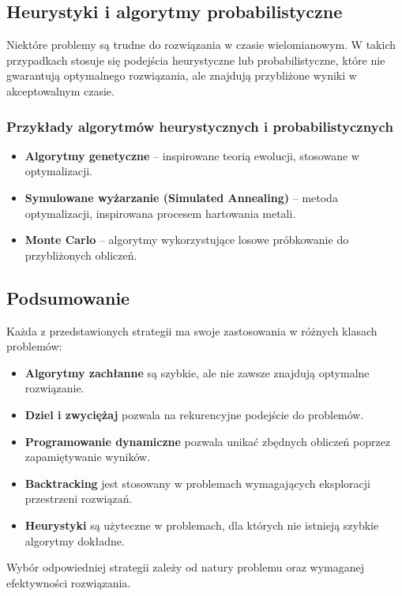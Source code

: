 \subsection{Heurystyki i algorytmy probabilistyczne}
Niektóre problemy są trudne do rozwiązania w czasie wielomianowym. W takich przypadkach stosuje się podejścia heurystyczne lub probabilistyczne, które nie gwarantują optymalnego rozwiązania, ale znajdują przybliżone wyniki w akceptowalnym czasie.

\subsubsection{Przykłady algorytmów heurystycznych i probabilistycznych}
\begin{itemize}
    \item \textbf{Algorytmy genetyczne} – inspirowane teorią ewolucji, stosowane w optymalizacji.
    \item \textbf{Symulowane wyżarzanie (Simulated Annealing)} – metoda optymalizacji, inspirowana procesem hartowania metali.
    \item \textbf{Monte Carlo} – algorytmy wykorzystujące losowe próbkowanie do przybliżonych obliczeń.
\end{itemize}

\subsection{Podsumowanie}
Każda z przedstawionych strategii ma swoje zastosowania w różnych klasach problemów:
\begin{itemize}
    \item \textbf{Algorytmy zachłanne} są szybkie, ale nie zawsze znajdują optymalne rozwiązanie.
    \item \textbf{Dziel i zwyciężaj} pozwala na rekurencyjne podejście do problemów.
    \item \textbf{Programowanie dynamiczne} pozwala unikać zbędnych obliczeń poprzez zapamiętywanie wyników.
    \item \textbf{Backtracking} jest stosowany w problemach wymagających eksploracji przestrzeni rozwiązań.
    \item \textbf{Heurystyki} są użyteczne w problemach, dla których nie istnieją szybkie algorytmy dokładne.
\end{itemize}
Wybór odpowiedniej strategii zależy od natury problemu oraz wymaganej efektywności rozwiązania.
